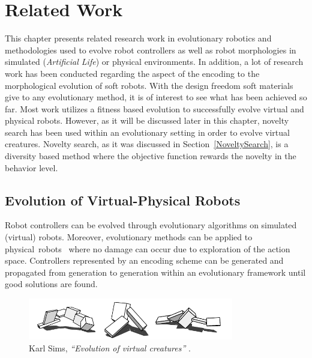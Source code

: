 
\chapter{Related Work} %

\label{Related Work} %


This chapter presents related research work in evolutionary robotics and methodologies used to evolve robot controllers as well as robot morphologies in simulated (\emph{Artificial Life}) or physical environments. In addition, a lot of research work has been conducted regarding the aspect of the encoding to the morphological evolution of soft robots. With the design freedom soft materials give to any evolutionary method, it is of interest to see what has been achieved so far. Most work utilizes a fitness based evolution to successfully evolve virtual and physical robots. However, as it will be discussed later in this chapter, novelty search has been used within an evolutionary setting in order to evolve virtual creatures. Novelty search, as it was discussed in Section~\ref{NoveltySearch}, is a diversity based method where the objective function rewards the novelty in the behavior level.


\section{Evolution of Virtual-Physical Robots}

Robot controllers can be evolved through evolutionary algorithms on simulated (virtual) robots. Moreover, evolutionary methods can be applied to physical~robots~\citep{nolfi1994evolve} where no damage can occur due to exploration of the action space. Controllers represented by an encoding scheme can be generated and propagated from generation to generation within an evolutionary framework until good solutions are found.

\begin{figure}[b!]
\centering
\includegraphics[width=0.8\textwidth]{../Figures/Misc/evolvingVirtualCreatures.png}
\caption{Karl Sims, \textit{``Evolution of virtual creatures''} \citep{sims1994evolving}.}
\label{fig:karlSims}
\end{figure}

